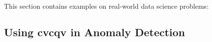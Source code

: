 This section contains examples on real-world data science problems: 

\subsection{Using cvcqv in Anomaly Detection}



\address{%
  Maani Beigy\\
  Department of Epidemiology and Biostatistics\\
  School of Public Health\\
  Tehran University of Medical Sciences\\
  Tehran\\
  Iran\\
  ORCiD: 0000-0003-2963-3533\\
  \\
}